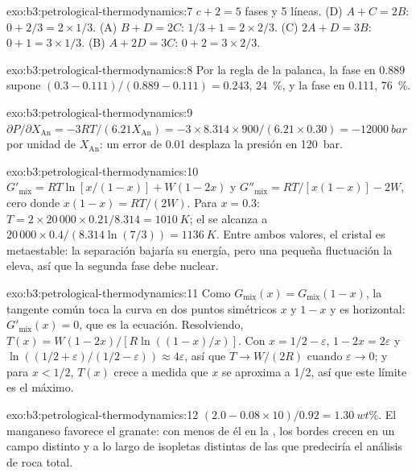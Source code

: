 \begin{solution}{exo:b3:petrological-thermodynamics:7}
$c + 2 = 5$ fases y 5 líneas. (D) $A + C = 2B$: $0 + 2/3 = 2\times1/3$. (A)
$B + D = 2C$: $1/3 + 1 = 2\times2/3$. (C) $2A + D = 3B$: $0 + 1 = 3\times1/3$.
(B) $A + 2D = 3C$: $0 + 2 = 3\times2/3$.
\end{solution}

\begin{solution}{exo:b3:petrological-thermodynamics:8}
Por la regla de la palanca, la fase en 0.889 supone $(0.3 - 0.111)/(0.889 - 0.111) =
0.243$, \qty{24}{\percent}, y la fase en 0.111, \qty{76}{\percent}.
\end{solution}

\begin{solution}{exo:b3:petrological-thermodynamics:9}
$\partial P/\partial X_{\text{An}} = -3RT/(6.21X_{\text{An}}) =
-3\times8.314\times900/(6.21\times0.30) = \qty{-12000}{bar}$ por unidad de
$X_{\text{An}}$: un error de 0.01 desplaza la presión en \qty{120}{bar}.
\end{solution}

\begin{solution}{exo:b3:petrological-thermodynamics:10}
$G'_{\text{mix}} = RT\ln[x/(1 - x)] + W(1 - 2x)$ y $G''_{\text{mix}} =
RT/[x(1 - x)] - 2W$, cero donde $x(1 - x) = RT/(2W)$. Para $x = 0.3$: $T =
2\times20\,000\times0.21/8.314 = \qty{1010}{K}$; el  se alcanza a
$20\,000\times0.4/(8.314\ln(7/3)) = \qty{1136}{K}$. Entre ambos valores, el
cristal es metaestable: la separación bajaría su energía, pero una pequeña
fluctuación la eleva, así que la segunda fase debe nuclear.
\end{solution}

\begin{solution}{exo:b3:petrological-thermodynamics:11}
Como $G_{\text{mix}}(x) = G_{\text{mix}}(1 - x)$, la tangente común toca
la curva en dos puntos simétricos $x$ y $1 - x$ y es horizontal:
$G'_{\text{mix}}(x) = 0$, que es la ecuación. Resolviendo, $T(x) = W(1 -
2x)/[R\ln((1 - x)/x)]$. Con $x = 1/2 - \varepsilon$, $1 - 2x = 2\varepsilon$
y $\ln((1/2 + \varepsilon)/(1/2 - \varepsilon)) \approx 4\varepsilon$, así que
$T \to W/(2R)$ cuando $\varepsilon \to 0$; y para $x < 1/2$, $T(x)$ crece a medida que $x$
se aproxima a 1/2, así que este límite es el máximo.
\end{solution}

\begin{solution}{exo:b3:petrological-thermodynamics:12}
$(2.0 - 0.08\times10)/0.92 = \qty{1.30}{wt\percent}$. El manganeso favorece
el granate: con menos de él en la , los bordes crecen en un
campo distinto y a lo largo de isopletas distintas de las que predeciría el
análisis de roca total.
\end{solution}

